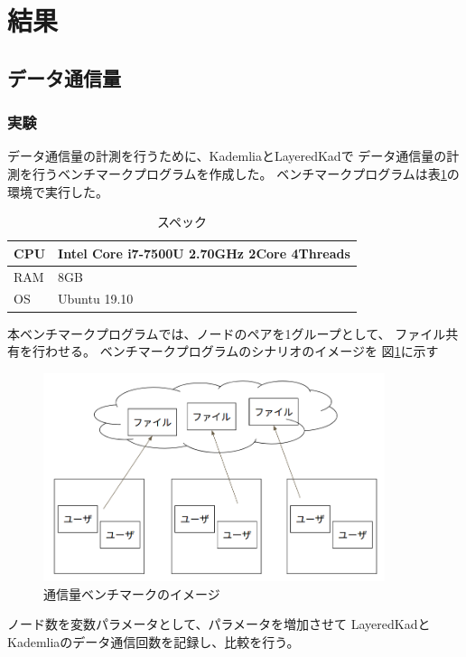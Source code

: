 \documentclass[sotsuron]{jcsie}
\begin{document}
\section{結果}
\subsection{データ通信量}

\subsubsection{実験}

データ通信量の計測を行うために、KademliaとLayeredKadで
データ通信量の計測を行うベンチマークプログラムを作成した。
ベンチマークプログラムは表\ref{table:spec-note}の環境で実行した。

\begin{table}[H]
	\caption{スペック}	
	\centering
	\label{table:spec-note}
	\begin{tabular}{|l|l|}
		\hline
		CPU &   
		Intel Core i7-7500U 2.70GHz 2Core 4Threads\\ \hline	
		RAM &   
		8GB \\ \hline	
		OS  &   
		Ubuntu 19.10 \\ \hline
	\end{tabular}	
\end{table}

本ベンチマークプログラムでは、ノードのペアを1グループとして、
ファイル共有を行わせる。
ベンチマークプログラムのシナリオのイメージを
図\ref{fig:trafficBenchmark}に示す

\begin{figure}[H]
	\centering
	\includegraphics[width=10cm]{./assets/image/traffic_benchmark.png}
	\caption{通信量ベンチマークのイメージ}
	\label{fig:trafficBenchmark}
\end{figure}

ノード数を変数パラメータとして、パラメータを増加させて
LayeredKadとKademliaのデータ通信回数を記録し、比較を行う。
\end{document}
